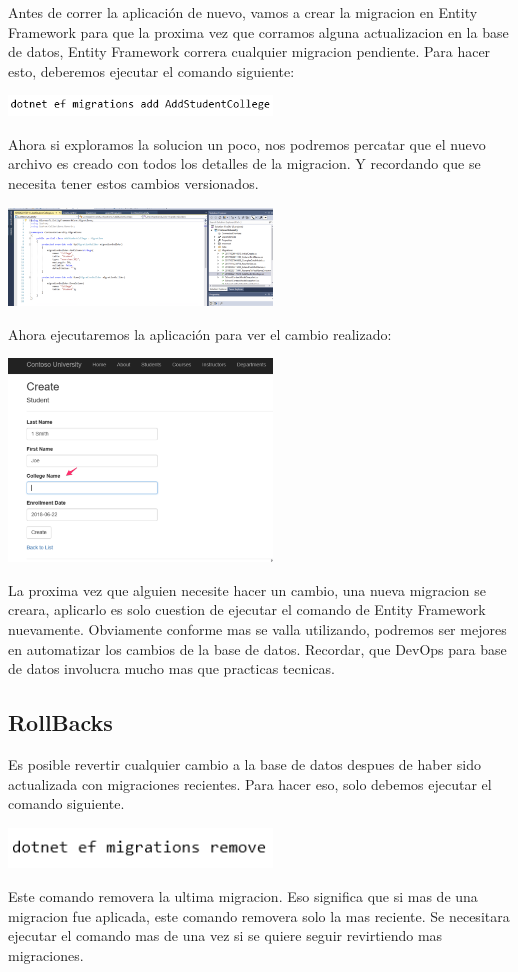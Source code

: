 \documentclass[twoside,twocolumn]{article}
\begin{document}
Antes de correr la aplicación de nuevo, vamos a crear la migracion en Entity Framework para que la proxima vez que corramos alguna actualizacion en la base de datos, Entity Framework correra cualquier migracion pendiente. Para hacer esto, deberemos ejecutar el comando siguiente:
\begin{center}
	\includegraphics[width=7cm]{./Imagenes/codigo1} 
	\end{center}
Ahora si exploramos la solucion un poco, nos podremos percatar que el nuevo archivo es creado con todos los detalles de la migracion. Y recordando que se necesita tener estos cambios versionados.
\begin{center}
	\includegraphics[width=7cm]{./Imagenes/cambios4} 
	\end{center}
Ahora ejecutaremos la aplicación para ver el cambio realizado:
\begin{center}
	\includegraphics[width=7cm]{./Imagenes/cambios5} 
	\end{center}
La proxima vez que alguien necesite hacer un cambio, una nueva migracion se creara, aplicarlo es solo cuestion de ejecutar el comando de Entity Framework nuevamente. Obviamente conforme mas se valla utilizando, podremos ser mejores en automatizar los cambios de la base de datos. Recordar, que DevOps para base de datos involucra mucho mas que practicas tecnicas. 
\subsection{RollBacks}
Es posible revertir cualquier cambio a la base de datos despues de haber sido actualizada con migraciones recientes. Para hacer eso, solo debemos ejecutar el comando siguiente.
\begin{center}
	\includegraphics[width=7cm]{./Imagenes/codigo2} 
	\end{center}
Este comando removera la ultima migracion. Eso significa que si mas de una migracion fue aplicada, este comando removera solo la mas reciente. Se necesitara ejecutar el comando mas de una vez si se quiere seguir revirtiendo mas migraciones.
\end{document}
